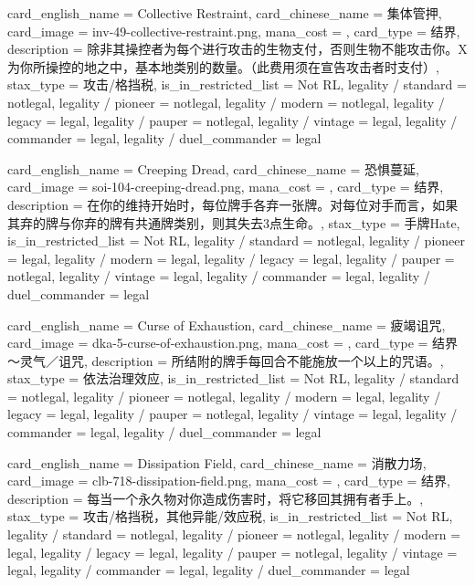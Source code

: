 \documentclass[lang = cn, color = black, 10pt]{AllThatStax}
\begin{document}
\card
{
	card_english_name = {Collective Restraint},
	card_chinese_name = {集体管押},
	card_image = inv-49-collective-restraint.png,
	mana_cost = ,
	card_type = 结界,
	description = {除非其操控者为每个进行攻击的生物支付，否则生物不能攻击你。X为你所操控的地之中，基本地类别的数量。（此费用须在宣告攻击者时支付）},
	stax_type = 攻击/格挡税,
	is_in_restricted_list = Not RL,
	legality / standard = notlegal,
	legality / pioneer = notlegal,
	legality / modern = notlegal,
	legality / legacy = legal,
	legality / pauper = notlegal,
	legality / vintage = legal,
	legality / commander = legal,
	legality / duel_commander = legal
}

\card
{
	card_english_name = {Creeping Dread},
	card_chinese_name = {恐惧蔓延},
	card_image = soi-104-creeping-dread.png,
	mana_cost = ,
	card_type = 结界,
	description = {在你的维持开始时，每位牌手各弃一张牌。对每位对手而言，如果其弃的牌与你弃的牌有共通牌类别，则其失去3点生命。},
	stax_type = 手牌Hate,
	is_in_restricted_list = Not RL,
	legality / standard = notlegal,
	legality / pioneer = legal,
	legality / modern = legal,
	legality / legacy = legal,
	legality / pauper = notlegal,
	legality / vintage = legal,
	legality / commander = legal,
	legality / duel_commander = legal
}

\card
{
	card_english_name = {Curse of Exhaustion},
	card_chinese_name = {疲竭诅咒},
	card_image = dka-5-curse-of-exhaustion.png,
	mana_cost = ,
	card_type = 结界～灵气／诅咒,
	description = {所结附的牌手每回合不能施放一个以上的咒语。},
	stax_type = 依法治理效应,
	is_in_restricted_list = Not RL,
	legality / standard = notlegal,
	legality / pioneer = notlegal,
	legality / modern = legal,
	legality / legacy = legal,
	legality / pauper = notlegal,
	legality / vintage = legal,
	legality / commander = legal,
	legality / duel_commander = legal
}

\card
{
	card_english_name = {Dissipation Field},
	card_chinese_name = {消散力场},
	card_image = clb-718-dissipation-field.png,
	mana_cost = ,
	card_type = 结界,
	description = {每当一个永久物对你造成伤害时，将它移回其拥有者手上。},
	stax_type = 攻击/格挡税，其他异能/效应税,
	is_in_restricted_list = Not RL,
	legality / standard = notlegal,
	legality / pioneer = notlegal,
	legality / modern = legal,
	legality / legacy = legal,
	legality / pauper = notlegal,
	legality / vintage = legal,
	legality / commander = legal,
	legality / duel_commander = legal
}
\end{document}
